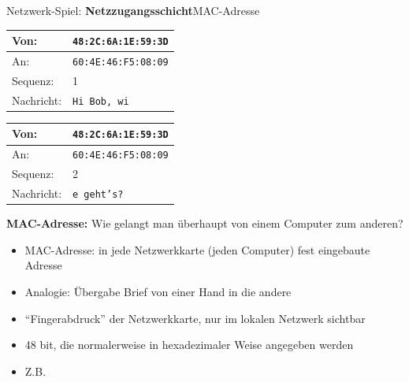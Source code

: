 \begin{frame}[fragile]{Netzwerk-Spiel: \textbf{Netzzugangsschicht}}{\acrshort{MAC}-Adresse}
    \begin{table}[H]
        \footnotesize
        \centering
        \begin{tabular}{ll}
            \rowcolor{\dataLinkLayerColor!20} Von:         & \texttt{48:2C:6A:1E:59:3D} \\\midrule
            \rowcolor{\dataLinkLayerColor!20} An:          & \texttt{60:4E:46:F5:08:09} \\\midrule
            \rowcolor{\transportLayerColor!20}Sequenz:     & 1                          \\\midrule
            \rowcolor{\applicationLayerColor!20}Nachricht: & \texttt{Hi Bob, wi}        \\
        \end{tabular}
        \begin{tabular}{ll}
            \rowcolor{\dataLinkLayerColor!20} Von:         & \texttt{48:2C:6A:1E:59:3D} \\\midrule
            \rowcolor{\dataLinkLayerColor!20} An:          & \texttt{60:4E:46:F5:08:09} \\\midrule
            \rowcolor{\transportLayerColor!20}Sequenz:     & 2                          \\\midrule
            \rowcolor{\applicationLayerColor!20}Nachricht: & \texttt{e geht's?}         \\
        \end{tabular}
    \end{table}
    \faFingerprint{} \textbf{\acrshort{MAC}-Adresse:} Wie gelangt man überhaupt von einem Computer zum anderen?
    \begin{itemize}[<+->]
        \item \gls{MAC}-Adresse: in jede Netzwerkkarte (jeden Computer) fest eingebaute Adresse
        \item Analogie: Übergabe Brief von einer Hand in die andere
        \item \enquote{Fingerabdruck} der Netzwerkkarte, nur im lokalen Netzwerk sichtbar
        \item 48 bit, die normalerweise in hexadezimaler Weise angegeben werden
        \item Z.B. 
    \end{itemize}
\end{frame}

